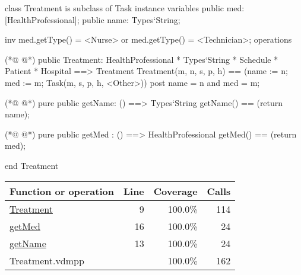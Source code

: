 \begin{vdmpp}[breaklines=true]
class Treatment is subclass of Task
instance variables
  public med: [HealthProfessional];
  public name: Types`String;
  
  inv med.getType() = <Nurse> or med.getType() = <Technician>;
operations

(*@
\label{Treatment:9}
@*)
 public Treatment: HealthProfessional * Types`String * Schedule * Patient * Hospital ==> Treatment
  Treatment(m, n, s, p, h) == (name := n; med := m; Task(m, s, p, h, <Other>))
 post name = n and med = m;
 
(*@
\label{getName:13}
@*)
 pure public getName: () ==> Types`String
  getName() == (return name);
 
(*@
\label{getMed:16}
@*)
 pure public getMed : () ==> HealthProfessional
  getMed() == (return med);

end Treatment
\end{vdmpp}
\bigskip
\begin{longtable}{|l|r|r|r|}
\hline
Function or operation & Line & Coverage & Calls \\
\hline
\hline
\hyperref[Treatment:9]{Treatment} & 9&100.0\% & 114 \\
\hline
\hyperref[getMed:16]{getMed} & 16&100.0\% & 24 \\
\hline
\hyperref[getName:13]{getName} & 13&100.0\% & 24 \\
\hline
\hline
Treatment.vdmpp & & 100.0\% & 162 \\
\hline
\end{longtable}

